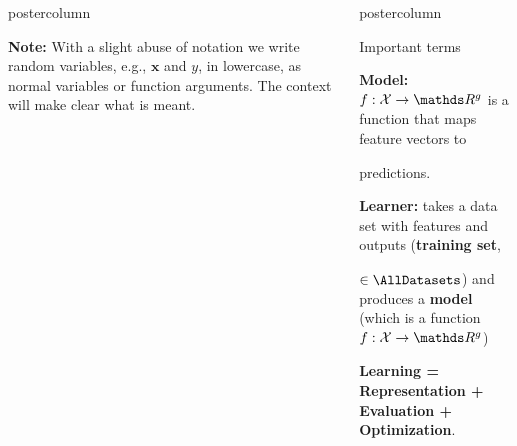 \documentclass{beamer}
\newlength{\columnheight} %
\begin{document}
\begin{frame}[fragile]{}
\begin{columns}
\begin{column}{.31\textwidth}
\begin{beamercolorbox}[center]{postercolumn}
\begin{minipage}{.98\textwidth}
{\begin{myblock}{}
						\textbf{Note:} With a slight abuse of notation we write random variables, e.g., $\mathbf{x}$ and $y$, in lowercase, as normal variables or function arguments. The context will make clear what is meant.
						\end{myblock}
				}
			\end{minipage}
		\end{beamercolorbox}
	\end{column}
	\begin{column}{.31\textwidth}
		\begin{beamercolorbox}[center]{postercolumn}
			\begin{minipage}{.98\textwidth}
				\parbox[t][\columnheight]{\textwidth}{
				    \begin{myblock}{Important terms}
				        \begin{codebox}
						    \textbf{Model: }$f : \Xspace \rightarrow \R^g$ is a function that maps feature vectors to 
						\end{codebox}
						\begin{codebox}
						    predictions.
						\end{codebox}
            \vspace*{0.5ex}
						\begin{codebox}
						\textbf{Learner: } takes a data set with features and outputs (\textbf{training set},
						\end{codebox}
						\begin{codebox}
						$\in \AllDatasets$)  and produces a \textbf{model} (which is a function $f : \Xspace \rightarrow \R^g$)
						\end{codebox}
						
            \vspace*{0.5ex}
						\begin{codebox}
						    \textbf{Learning = Representation + Evaluation  + Optimization}.
						\end{codebox}
						

\end{myblock}}
\end{minipage}
\end{beamercolorbox}
\end{column}
\end{columns}
\end{frame}
\end{document}
